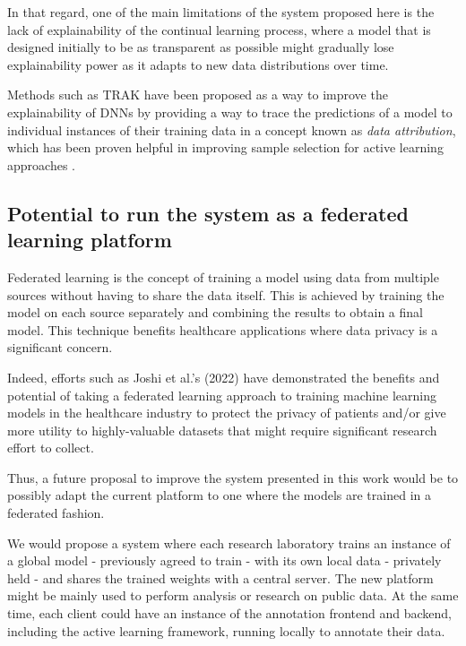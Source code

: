 \documentclass[../main.tex]{subfiles}
\begin{document}
    In that regard, one of the main limitations of the system proposed here is the lack of explainability of the continual learning process, where a model that is designed initially to be as transparent as possible might gradually lose explainability power as it adapts to new data distributions over time.
    
    
    
    Methods such as TRAK \cite{park_trak_2023} have been proposed as a way to improve the explainability of DNNs by providing a way to trace the predictions of a model to individual instances of their training data in a concept known as \textit{data attribution}, which has been proven helpful in improving sample selection for active learning approaches \cite{park_trak_2023, holzmuller_framework_2023, liu_influence_2021}.

    \subsection{Potential to run the system as a federated learning platform} \label{conclusions:future_work:federated} 


    Federated learning is the concept of training a model using data from multiple sources without having to share the data itself. This is achieved by training the model on each source separately and combining the results to obtain a final model. This technique benefits healthcare applications where data privacy is a significant concern. 
    
    Indeed, efforts such as Joshi et al.'s (2022) \cite{joshi_federated_2022} have demonstrated the benefits and potential of taking a federated learning approach to training machine learning models in the healthcare industry to protect the privacy of patients and/or give more utility to highly-valuable datasets that might require significant research effort to collect.
    
    Thus, a future proposal to improve the system presented in this work would be to possibly adapt the current platform to one where the models are trained in a federated fashion.
    
    We would propose a system where each research laboratory trains an instance of a global model - previously agreed to train  - with its own local data - privately held - and shares the trained weights with a central server. The new platform might be mainly used to perform analysis or research on public data. At the same time, each client could have an instance of the annotation frontend and backend, including the active learning framework, running locally to annotate their data. 
    
\end{document}
